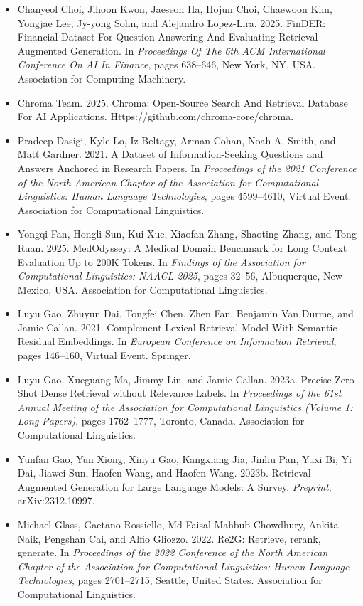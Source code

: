 \documentclass[10pt]{article}
\begin{document}
\begin{itemize}
    \item Chanyeol Choi, Jihoon Kwon, Jaeseon Ha, Hojun Choi, Chaewoon Kim, Yongjae Lee, Jy-yong Sohn, and Alejandro Lopez-Lira. 2025. FinDER: Financial Dataset For Question Answering And Evaluating Retrieval-Augmented Generation. In \textit{Proceedings Of The 6th ACM International Conference On AI In Finance}, pages 638--646, New York, NY, USA. Association for Computing Machinery.
    \item Chroma Team. 2025. Chroma: Open-Source Search And Retrieval Database For AI Applications. Https://github.com/chroma-core/chroma.
    \item Pradeep Dasigi, Kyle Lo, Iz Beltagy, Arman Cohan, Noah A. Smith, and Matt Gardner. 2021. A Dataset of Information-Seeking Questions and Answers Anchored in Research Papers. In \textit{Proceedings of the 2021 Conference of the North American Chapter of the Association for Computational Linguistics: Human Language Technologies}, pages 4599--4610, Virtual Event. Association for Computational Linguistics.
    \item Yongqi Fan, Hongli Sun, Kui Xue, Xiaofan Zhang, Shaoting Zhang, and Tong Ruan. 2025. MedOdyssey: A Medical Domain Benchmark for Long Context Evaluation Up to 200K Tokens. In \textit{Findings of the Association for Computational Linguistics: NAACL 2025}, pages 32--56, Albuquerque, New Mexico, USA. Association for Computational Linguistics.
    \item Luyu Gao, Zhuyun Dai, Tongfei Chen, Zhen Fan, Benjamin Van Durme, and Jamie Callan. 2021. Complement Lexical Retrieval Model With Semantic Residual Embeddings. In \textit{European Conference on Information Retrieval}, pages 146--160, Virtual Event. Springer.
    \item Luyu Gao, Xueguang Ma, Jimmy Lin, and Jamie Callan. 2023a. Precise Zero-Shot Dense Retrieval without Relevance Labels. In \textit{Proceedings of the 61st Annual Meeting of the Association for Computational Linguistics (Volume 1: Long Papers)}, pages 1762--1777, Toronto, Canada. Association for Computational Linguistics.
    \item Yunfan Gao, Yun Xiong, Xinyu Gao, Kangxiang Jia, Jinliu Pan, Yuxi Bi, Yi Dai, Jiawei Sun, Haofen Wang, and Haofen Wang. 2023b. Retrieval-Augmented Generation for Large Language Models: A Survey. \textit{Preprint}, arXiv:2312.10997.
    \item Michael Glass, Gaetano Rossiello, Md Faisal Mahbub Chowdhury, Ankita Naik, Pengshan Cai, and Alfio Gliozzo. 2022. Re2G: Retrieve, rerank, generate. In \textit{Proceedings of the 2022 Conference of the North American Chapter of the Association for Computational Linguistics: Human Language Technologies}, pages 2701--2715, Seattle, United States. Association for Computational Linguistics.

\end{itemize}
\end{document}
